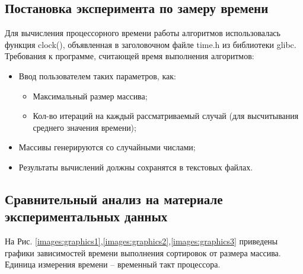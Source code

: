 \documentclass[a4paper,12pt]{article}
\begin{document}
\subsection{Постановка эксперимента по замеру времени}
Для вычисления процессорного времени работы алгоритмов использовалась функция clock(), объявленная в заголовочном файле time.h из библиотеки glibc. \\
Требования к программе, считающей время выполнения алгоритмов:
\begin{itemize}
\item Ввод пользователем таких параметров, как:
\begin{itemize}
\item Максимальный размер массива;
\item Кол-во итераций на каждый рассматриваемый случай (для высчитывания среднего значения времени);
\end{itemize}
\item Массивы генерируются со случайными числами;
\item Результаты вычислений должны сохранятся в текстовых файлах.
\end{itemize}

\newpage
\subsection{Сравнительный анализ на материале экспериментальных данных}
На Рис. \ref{images:graphics1},\ref{images:graphics2},\ref{images:graphics3} приведены графики зависимостей времени выполнения сортировок от размера массива. Единица измерения времени – временный такт процессора. \\
\end{document}
